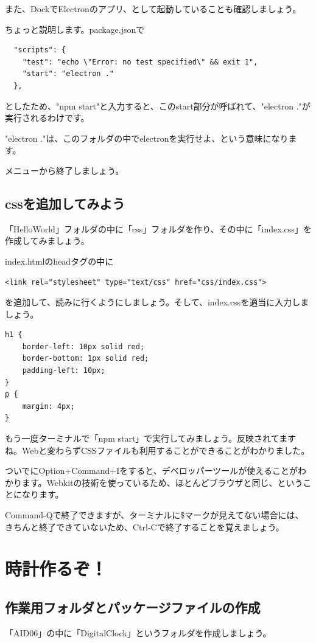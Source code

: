 \documentclass[mingoth,11pt,a4j,uplatex]{jsarticle}
\begin{document}
また、DockでElectronのアプリ、として起動していることも確認しましょう。

ちょっと説明します。package.jsonで
\begin{verbatim}
  "scripts": {
    "test": "echo \"Error: no test specified\" && exit 1",
    "start": "electron ."
  },
\end{verbatim}
としたため、"npm start"と入力すると、このstart部分が呼ばれて、"electron ."が実行されるわけです。

"electron ."は、このフォルダの中でelectronを実行せよ、という意味になります。

メニューから終了しましょう。

\subsection{cssを追加してみよう}
「HelloWorld」フォルダの中に「css」フォルダを作り、その中に「index.css」を作成してみましょう。

index.htmlのheadタグの中に
\begin{lstlisting}[caption=Hello World：index.html headタグ内]
    <link rel="stylesheet" type="text/css" href="css/index.css">
\end{lstlisting}
を追加して、読みに行くようにしましょう。そして、index.cssを適当に入力しましょう。
\begin{lstlisting}[caption=Hello World：css/index.css]
h1 {
    border-left: 10px solid red;
    border-bottom: 1px solid red;
    padding-left: 10px;
}
p {
    margin: 4px;
}
\end{lstlisting}
もう一度ターミナルで「npm start」で実行してみましょう。反映されてますね。Webと変わらずCSSファイルも利用することができることがわかりました。

ついでにOption+Command+Iをすると、デベロッパーツールが使えることがわかります。Webkitの技術を使っているため、ほとんどブラウザと同じ、ということになります。

Command-Qで終了できますが、ターミナルに\$マークが見えてない場合には、きちんと終了できていないため、Ctrl-Cで終了することを覚えましょう。

\section{時計作るぞ！}

\subsection{作業用フォルダとパッケージファイルの作成}
「AID06」の中に「DigitalClock」というフォルダを作成しましょう。
\end{document}
